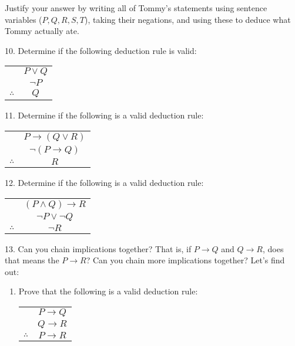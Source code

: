 \documentclass[10pt,]{book}
\theoremstyle{plain}
\theoremstyle{definition}
\numberwithin{equation}{chapter}
\newcommand{\hrulethin}  {\noalign{\hrule height 0.04em}}
\def\imp{\rightarrow}
\begin{document}
\begin{exerciselist}
      Justify your answer by writing all of Tommy's statements using sentence variables (\(P, Q, R, S, T\)), taking their negations, and using these to deduce what Tommy actually ate.
\par\smallskip
\item[10.]\hypertarget{exercise-235}{}
          Determine if the following deduction rule is valid:
\leavevmode%
\begin{table}
\centering
\begin{tabular}{cc}
&\(P \vee Q\)\tabularnewline[0pt]
&\(\neg P\)\tabularnewline\hrulethin
\(\therefore\)&\(Q\)
\end{tabular}
\end{table}
\par\smallskip
\item[11.]\hypertarget{exercise-236}{}
          Determine if the following is a valid deduction rule:
\leavevmode%
\begin{table}
\centering
\begin{tabular}{cc}
&\(P \imp (Q \vee R)\)\tabularnewline[0pt]
&\(\neg(P \imp Q)\)\tabularnewline\hrulethin
\(\therefore\)&\(R\)
\end{tabular}
\end{table}
\par\smallskip
\item[12.]\hypertarget{exercise-237}{}
          Determine if the following is a valid deduction rule:
\leavevmode%
\begin{table}
\centering
\begin{tabular}{cc}
&\((P \wedge Q) \imp R\)\tabularnewline[0pt]
&\(\neg P \vee \neg Q\)\tabularnewline\hrulethin
\(\therefore\)&\(\neg R\)
\end{tabular}
\end{table}
\par\smallskip
\item[13.]\hypertarget{exercise-238}{}
          Can you chain implications together? That is, if \(P \imp Q\) and \(Q \imp R\), does that means the \(P \imp R\)? Can you chain more implications together? Let's find out:
\leavevmode%
\begin{enumerate}[label=(\alph*)]
\item\hypertarget{li-654}{}
              Prove that the following is a valid deduction rule:
              \leavevmode%
\begin{table}
\centering
\begin{tabular}{cc}
&\(P \imp Q\)\tabularnewline[0pt]
&\(Q \imp R\)\tabularnewline\hrulethin
\(\therefore\)&\(P \imp R\)
\end{tabular}
\end{table}



\end{enumerate}
\end{exerciselist}
\end{document}
